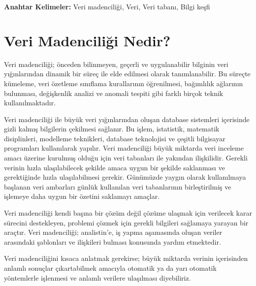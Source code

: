 \documentclass{article}
\begin{document}
\vspace{10pt}
\textbf{Anahtar Kelimeler: } Veri madenciliği, Veri, Veri tabanı, Bilgi keşfi

\newpage
\section{Veri Madenciliği Nedir?}

\vspace{10pt}
 Veri madenciliği; önceden bilinmeyen, geçerli ve uygulanabilir bilginin veri yığınlarından dinamik bir süreç ile elde edilmesi olarak tanımlanabilir. Bu
süreçte kümeleme, veri özetleme sınıflama kurallarının öğrenilmesi, bağımlılık
ağlarının bulunması, değişkenlik analizi ve anomali tespiti gibi farklı birçok
teknik kullanılmaktadır.

\vspace{10pt}
Veri madenciliği ile büyük veri yığınlarından oluşan database sistemleri
içerisinde gizli kalmış bilgilerin çekilmesi sağlanır. Bu işlem, istatistik,
matematik disiplinleri, modelleme teknikleri, database teknolojisi ve çeşitli
bilgisayar programları kullanılarak yapılır. Veri madenciliği büyük miktarda veri
inceleme amacı üzerine kurulmuş olduğu için veri tabanları ile yakından ilişkilidir.
Gerekli verinin hızla ulaşılabilecek şekilde amaca uygun bir şekilde saklanması ve
gerektiğinde hızla ulaşılabilmesi gerekir. Günümüzde yaygın olarak kullanılmaya
başlanan veri ambarları günlük kullanılan veri tabanlarının birleştirilmiş ve
işlemeye daha uygun bir özetini saklamayı amaçlar.

\vspace{10pt}
Veri madenciliği kendi başına bir çözüm değil çözüme ulaşmak için
verilecek karar sürecini destekleyen, problemi çözmek için gerekli bilgileri
sağlamaya yarayan bir araçtır. Veri madenciliği; analistin’e, iş yapma
aşamasında oluşan veriler arasındaki şablonları ve ilişkileri bulması konusunda
yardım etmektedir.

\vspace{10pt}
Veri madenciliğini kısaca anlatmak gerekirse; büyük miktarda verinin içerisinden anlamlı sonuçlar çıkartabilmek amacıyla otomatik ya da yarı otomatik yöntemlerle işlenmesi ve anlamlı verilere ulaşılması diyebiliriz.

\vspace{15pt}
\end{document}
